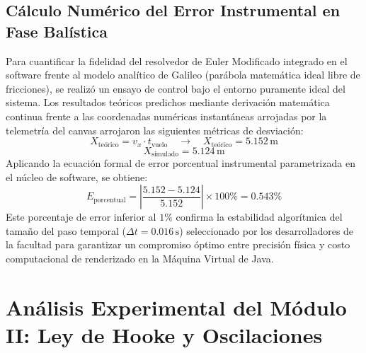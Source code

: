 \documentclass[11pt,a4paper]{article}
\begin{document}
	\subsection{Cálculo Numérico del Error Instrumental en Fase Balística}
	Para cuantificar la fidelidad del resolvedor de Euler Modificado integrado en el software frente al modelo analítico de Galileo (parábola matemática ideal libre de fricciones), se realizó un ensayo de control bajo el entorno puramente ideal del sistema. Los resultados teóricos predichos mediante derivación matemática continua frente a las coordenadas numéricas instantáneas arrojadas por la telemetría del canvas arrojaron las siguientes métricas de desviación:
	\begin{equation}
		X_{\text{teórico}} = v_x \cdot t_{\text{vuelo}} \quad \longrightarrow \quad X_{\text{teórico}} = 5.152\,\text{m}
	\end{equation}
	\begin{equation}
		X_{\text{simulado}} = 5.124\,\text{m}
	\end{equation}
	Aplicando la ecuación formal de error porcentual instrumental parametrizada en el núcleo de software, se obtiene:
	\begin{equation}
		E_{\text{porcentual}} = \left| \frac{5.152 - 5.124}{5.152} \right| \times 100\% = 0.543\%
	\end{equation}
	Este porcentaje de error inferior al $1\%$ confirma la estabilidad algorítmica del tamaño del paso temporal ($\Delta t = 0.016\,\text{s}$) seleccionado por los desarrolladores de la facultad para garantizar un compromiso óptimo entre precisión física y costo computacional de renderizado en la Máquina Virtual de Java.
	
	\section{Análisis Experimental del Módulo II: Ley de Hooke y Oscilaciones}
	
\end{document}
